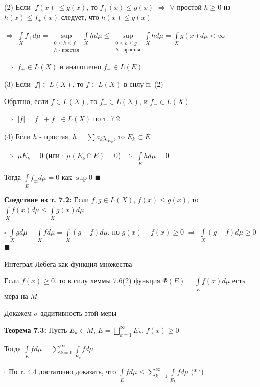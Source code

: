 \documentclass[a4paper]{report}
\begin{document}
(2) Если $|f(x)|\le g(x)$, то $f_+(x)\le g(x)$ $\Rightarrow$ $\forall$ простой $h\ge0$ из $h(x)\le f_+(x)$ следует, что $h(x)\le g(x)$

$\Rightarrow$ $\displaystyle\int\limits_X f_+d\mu=\sup\limits_{\substack{0\le h\le f_+\\ h\text{ - простая}}}\displaystyle\int\limits_X hd\mu\le\sup\limits_{\substack{0\le h\le g\\ h
\text{ - простая}}}\displaystyle\int\limits_X hd\mu=\displaystyle\int\limits_X g(x)d\mu<\infty$

$\Rightarrow$ $f_+\in L(X)$ и аналогично $f_-\in L(E)$

(3) Если $|f|\in L(X)$, то $f\in L(X)$ в силу п. (2)

Обратно, если $f\in L(X)$, то $f_+\in L(X)$, и $f_-\in L(X)$

$\Rightarrow$ $|f|=f_++f_-\in L(X)$ по т. 7.2

(4) Если $h$ - простая, $h=\sum a_k\chi_{E_k}$, то $E_k\subset E$

$\Rightarrow$ $\mu E_k=0$ (или : $\mu(E_k\cap E)=0$) $\Rightarrow$ $\displaystyle\int\limits_E hd\mu=0$

Тогда $\displaystyle\int\limits_E f_\pm d\mu=0$ как $\sup{0}$ $\blacksquare$
\bigskip

\noindent\textbf{Следствие из т. 7.2:} Если $f,g\in L(X)$, $f(x)\le g(x)$, то $\displaystyle\int\limits_X f(x)d\mu\le\displaystyle\int\limits_X g(x) d\mu$

\noindent $\square$ $\displaystyle\int\limits_X gd\mu-\displaystyle\int\limits_X fd\mu=\displaystyle\int\limits_X(g-f)d\mu$, но $g(x)-f(x)\ge0$ $\Rightarrow$ $\displaystyle\int\limits_X(g-f)d\mu\ge0$ $\blacksquare$
\bigskip
\bigskip
\bigskip

\begin{center}
\Large{Интеграл Лебега как функция множества}
\end{center}

\normalsize
\bigskip

Если $f(x)\ge0$, то в силу леммы 7.6(2) функция $\Phi(E)=\displaystyle\int\limits_E f(x)d\mu$ есть мера на $M$

Докажем $\sigma$-аддитивность этой меры
\bigskip

\noindent\textbf{Теорема 7.3:} Пусть $E_k\in M$, $E=\bigsqcup\limits_{k=1}^\infty E_k$, $f(x)\ge0$

Тогда $\displaystyle\int\limits_E fd\mu=\sum\limits_{k=1}^\infty\displaystyle\int\limits_{E_k} fd\mu$

\noindent $\square$ По т. 4.4 достаточно доказать, что $\displaystyle\int\limits_E fd\mu\le\sum\limits_{k=1}^\infty\displaystyle\int\limits_{E_k}fd\mu$ (**)
\end{document}
